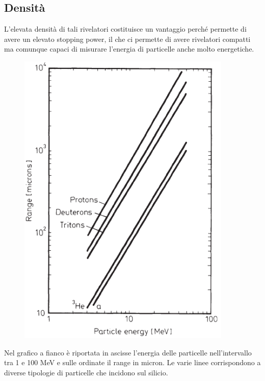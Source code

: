 \vspace{-0.15cm}

\subsection{Densità}
L'elevata densità di tali rivelatori costituisce un vantaggio perché permette di avere un elevato stopping power, il che ci permette di avere rivelatori compatti ma comunque capaci di misurare l'energia di particelle anche molto energetiche.

\begin{esempio}

   \vspace{-0.4cm}

   \begin{minipage}{0.36\textwidth}
      \begin{figure}[H]
         \centering
         \includegraphics[width=0.91\textwidth]{immagini/range_particelle_in_semiconduttori.png}
      \end{figure}
   \end{minipage}
   \begin{minipage}{0.63\textwidth}
      \vspace{0.3cm}Nel grafico a fianco è riportata in ascisse l'energia delle particelle nell'intervallo tra 1 e 100 MeV e sulle ordinate il range in micron. Le varie linee corrispondono a diverse tipologie di particelle che incidono sul silicio.


\end{minipage}
\end{esempio}
